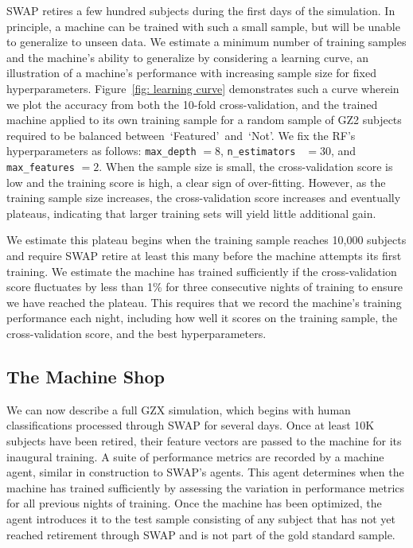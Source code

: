 \documentclass[twocolumn]{aastex6}%
\newcommand{\feat}{`Featured'}
\newcommand{\notfeat}{`Not'}
\begin{document}
SWAP retires a few hundred subjects during the first days of the simulation.
In principle,  a machine can be trained with such a small sample, but will be unable
to generalize to unseen data. We estimate a minimum number of training samples
and the machine's ability to generalize by considering a learning curve, an illustration
of a machine's performance with increasing sample size for fixed hyperparameters. 
Figure~\ref{fig: learning curve} demonstrates such a curve wherein we plot
the accuracy from both the 10-fold cross-validation, and the trained machine
applied to its own training sample for a random sample of GZ2 subjects
required to be balanced between~\feat~and~\notfeat.  
We fix the RF's hyperparameters as follows: \texttt{max\_depth} $=8$, 
\texttt{n\_estimators } $=30$, and \texttt{max\_features} $=2$. 
When the sample size is small, the cross-validation score is low and the training 
score is high, a clear sign of over-fitting.  However, as the training 
sample size increases, the cross-validation score increases and eventually plateaus,
 indicating that larger training sets will yield little additional gain. 

We estimate this plateau begins when the training 
sample reaches 10,000 subjects and require SWAP retire at least this many 
 before the machine attempts its first training.  We estimate the machine 
has trained sufficiently if the cross-validation score fluctuates by less than 1\% 
for three consecutive nights of training to ensure we have reached the plateau.  
This requires that we record the machine's training performance each night, 
including how well it scores on the training sample, the 
cross-validation score, and the best hyperparameters. 



\subsection{The Machine Shop}\label{sec: machine shop}
We can now describe a full GZX simulation, which begins with human classifications 
processed through SWAP for several days.   
Once at least 10K subjects have been retired, their feature vectors are passed to 
the machine for its inaugural training. 
A suite of performance metrics are recorded by a machine agent, similar
in construction to SWAP's agents. This agent determines 
when the machine has trained sufficiently by assessing the variation
in performance metrics for all previous nights of training. 
Once the machine has been optimized, the agent introduces it to the test sample
consisting of any subject that has not yet reached retirement through SWAP 
and is not part of the gold standard sample.  
\end{document}
